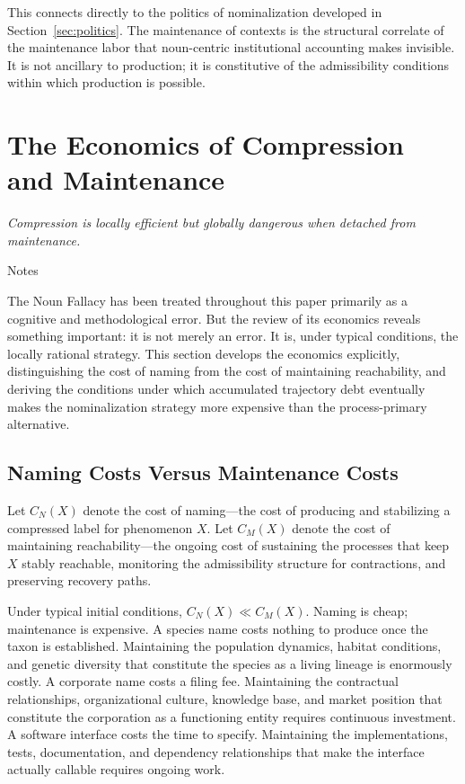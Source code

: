 \documentclass[12pt, a4paper]{article}
\theoremstyle{plain}
\theoremstyle{definition}
\theoremstyle{remark}
\begin{document}
This connects directly to the politics of nominalization developed in
Section~\ref{sec:politics}. The maintenance of contexts is the structural
correlate of the maintenance labor that noun-centric institutional accounting
makes invisible. It is not ancillary to production; it is constitutive of
the admissibility conditions within which production is possible.

\section{The Economics of Compression and Maintenance}
\label{sec:economics}

\epigraph{\textit{Compression is locally efficient but globally dangerous
when detached from maintenance.}}{Notes}

\noindent
The Noun Fallacy has been treated throughout this paper primarily as a
cognitive and methodological error. But the review of its economics reveals
something important: it is not merely an error. It is, under typical conditions,
the locally rational strategy. This section develops the economics explicitly,
distinguishing the cost of naming from the cost of maintaining reachability,
and deriving the conditions under which accumulated trajectory debt eventually
makes the nominalization strategy more expensive than the process-primary
alternative.

\subsection{Naming Costs Versus Maintenance Costs}

Let $C_N(X)$ denote the cost of naming---the cost of producing and stabilizing
a compressed label for phenomenon $X$. Let $C_M(X)$ denote the cost of
maintaining reachability---the ongoing cost of sustaining the processes that
keep $X$ stably reachable, monitoring the admissibility structure for
contractions, and preserving recovery paths.

Under typical initial conditions, $C_N(X) \ll C_M(X)$. Naming is cheap;
maintenance is expensive. A species name costs nothing to produce once the
taxon is established. Maintaining the population dynamics, habitat conditions,
and genetic diversity that constitute the species as a living lineage is
enormously costly. A corporate name costs a filing fee. Maintaining the
contractual relationships, organizational culture, knowledge base, and market
position that constitute the corporation as a functioning entity requires
continuous investment. A software interface costs the time to specify.
Maintaining the implementations, tests, documentation, and dependency
relationships that make the interface actually callable requires ongoing work.
\end{document}
